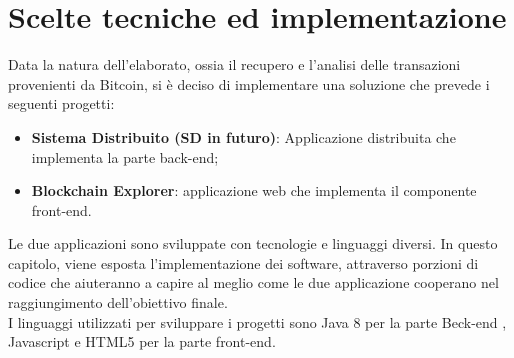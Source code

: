 \chapter{Scelte tecniche ed implementazione}
\label{chap:implementazione}
Data la natura dell'elaborato, ossia il recupero e l'analisi delle transazioni provenienti da Bitcoin, si è deciso di implementare una soluzione che prevede i seguenti progetti:
\begin{itemize}
\item \textbf{Sistema Distribuito (SD in futuro)}: Applicazione distribuita che implementa la parte back-end;
\item \textbf{Blockchain Explorer}: applicazione web che implementa il componente front-end.
\end{itemize}
Le due applicazioni sono sviluppate con tecnologie e linguaggi diversi. In questo capitolo, viene esposta l'implementazione dei software, attraverso porzioni di codice  che aiuteranno a capire al meglio come le due applicazione cooperano nel raggiungimento dell'obiettivo finale.
\\ I linguaggi utilizzati per sviluppare i progetti sono Java 8 per la parte Beck-end , Javascript e HTML5 per la parte front-end.
